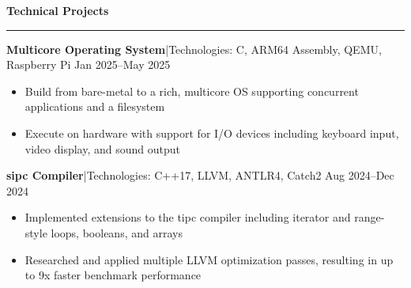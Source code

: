 \documentclass[11pt,letterpaper]{article}
\newcommand{\horibar}[2]{#1\hspace{5pt}|\hspace{5pt}#2}
\newcommand{\sep}[1]{\par\vspace{#1}}
\renewenvironment{section}[1]{
\sep{11pt}
{
\fontsize{14}{2}
\selectfont
\textbf{#1}\\[0.5pt]
}
\sep{4pt}
\noindent\rule{\linewidth}{0.5pt}
\sep{4pt}
}
{
}
\renewenvironment{subsection}[3]
{
\sep{4pt}
\horibar{\textbf{#1}}{#2} \hfill #3
\par\setstretch{1}
\begin{itemize}
}
{
\end{itemize}
\setstretch{0}
}
\begin{document}
\begin{section}{Technical Projects}
    \begin{subsection}{Multicore Operating System}{Technologies: C, ARM64 Assembly, QEMU, Raspberry Pi}{Jan 2025–May 2025}
        \item Build from bare-metal to a rich, multicore OS supporting concurrent applications and a filesystem
        \item Execute on hardware with support for I/O devices including keyboard input, video display, and sound output
    \end{subsection}
    \begin{subsection}{sipc Compiler}{Technologies: C++17, LLVM, ANTLR4, Catch2}{Aug 2024–Dec 2024}
        \item Implemented extensions to the tipc compiler including iterator and range-style loops, booleans, and arrays
        \item Researched and applied multiple LLVM optimization passes, resulting in up to 9x faster benchmark performance 
    \end{subsection}
\end{section}
\end{document}
